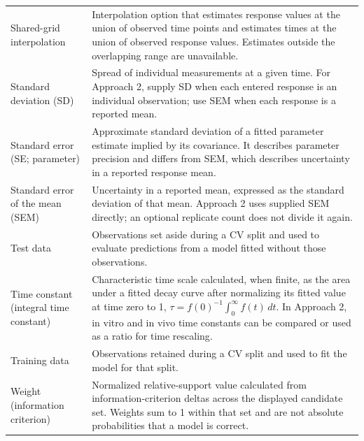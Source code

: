 \begin{longtable}{@{}>{\raggedright\arraybackslash}p{}>{\raggedright\arraybackslash}p{}@{}}
Shared-grid interpolation & Interpolation option that estimates response values at the union of observed time points and estimates times at the union of observed response values. Estimates outside the overlapping range are unavailable. \\


Standard deviation (SD) & Spread of individual measurements at a given time. For Approach 2, supply SD when each entered response is an individual observation; use SEM when each response is a reported mean. \\

Standard error (SE; parameter) & Approximate standard deviation of a fitted parameter estimate implied by its covariance. It describes parameter precision and differs from SEM, which describes uncertainty in a reported response mean. \\

Standard error of the mean (SEM) & Uncertainty in a reported mean, expressed as the standard deviation of that mean. Approach 2 uses supplied SEM directly; an optional replicate count does not divide it again. \\


Test data & Observations set aside during a CV split and used to evaluate predictions from a model fitted without those observations. \\

Time constant (integral time constant) & Characteristic time scale calculated, when finite, as the area under a fitted decay curve after normalizing its fitted value at time zero to 1, $\tau = f(0)^{-1}\int_0^\infty f(t)\,dt$. In Approach 2, in vitro and in vivo time constants can be compared or used as a ratio for time rescaling. \\

Training data & Observations retained during a CV split and used to fit the model for that split. \\

Weight (information criterion) & Normalized relative-support value calculated from information-criterion deltas across the displayed candidate set. Weights sum to 1 within that set and are not absolute probabilities that a model is correct. \\

\bottomrule
\end{longtable}
